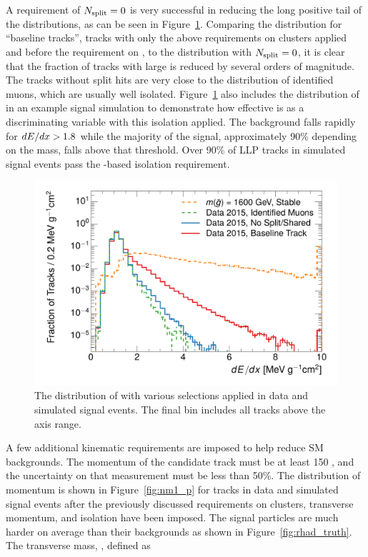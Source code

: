 A requirement of $N_{\mathrm{split}} = 0$ is very successful in reducing the long positive tail of the \dedx distributions, as can be seen in Figure~\ref{fig:dedx_isolation}.
Comparing the distribution for ``baseline tracks'', tracks with only the above requirements on clusters applied and before the requirement on \Nsplit, to the distribution with $N_{\mathrm{split}} = 0$, it is clear that the fraction of tracks with large \dedx is reduced by several orders of magnitude.
The tracks without split hits are very close to the \dedx distribution of identified muons, which are usually well isolated.
Figure~\ref{fig:dedx_isolation} also includes the distribution of \dedx in an example signal simulation to demonstrate how effective \dedx is as a discriminating variable with this isolation applied. 
The background falls rapidly for $dE/dx > 1.8$ \MeVgcm while the majority of the signal, approximately 90\% depending on the mass, falls above that threshold.
Over 90\% of \ac{LLP} tracks in simulated signal events pass the \Nsplit-based isolation requirement.


\begin{figure}[h]
\centering
\includegraphics[width=\fullfig]{figures/dedx_isolation.pdf}
\caption{The distribution of \dedx with various selections applied in data and simulated signal events. The final bin includes all tracks above the axis range.}
\label{fig:dedx_isolation}
\end{figure}

A few additional kinematic requirements are imposed to help reduce \ac{SM} backgrounds. 
The momentum of the candidate track must be at least 150 \GeV, and the uncertainty on that measurement must be less than 50\%. 
The distribution of momentum is shown in Figure~\ref{fig:nm1_p} for tracks in data and simulated signal events after the previously discussed requirements on clusters, transverse momentum, and isolation have been imposed.
The signal particles are much harder on average than their backgrounds as shown in Figure~\ref{fig:rhad_truth}.
The transverse mass, \mt, defined as 

